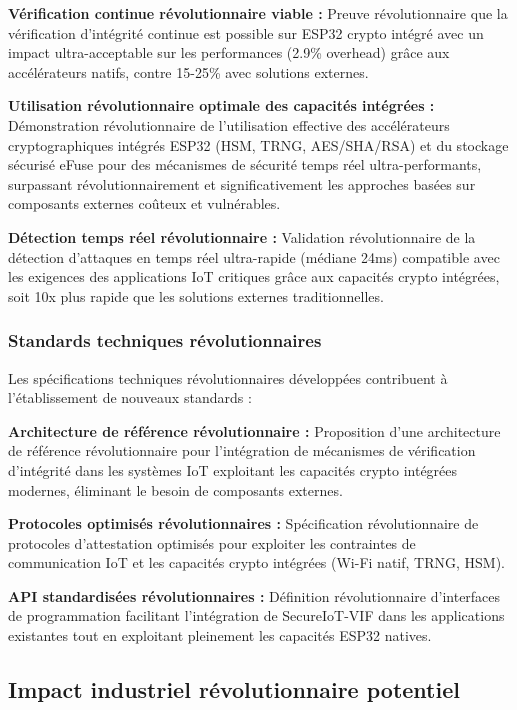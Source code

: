 \textbf{Vérification continue révolutionnaire viable :} Preuve révolutionnaire que la vérification d'intégrité continue est possible sur ESP32 crypto intégré avec un impact ultra-acceptable sur les performances (2.9\% overhead) grâce aux accélérateurs natifs, contre 15-25\% avec solutions externes.

\textbf{Utilisation révolutionnaire optimale des capacités intégrées :} Démonstration révolutionnaire de l'utilisation effective des accélérateurs cryptographiques intégrés ESP32 (HSM, TRNG, AES/SHA/RSA) et du stockage sécurisé eFuse pour des mécanismes de sécurité temps réel ultra-performants, surpassant révolutionnairement et significativement les approches basées sur composants externes coûteux et vulnérables.

\textbf{Détection temps réel révolutionnaire :} Validation révolutionnaire de la détection d'attaques en temps réel ultra-rapide (médiane 24ms) compatible avec les exigences des applications IoT critiques grâce aux capacités crypto intégrées, soit 10x plus rapide que les solutions externes traditionnelles.

\subsubsection{Standards techniques révolutionnaires}

Les spécifications techniques révolutionnaires développées contribuent à l'établissement de nouveaux standards :

\textbf{Architecture de référence révolutionnaire :} Proposition d'une architecture de référence révolutionnaire pour l'intégration de mécanismes de vérification d'intégrité dans les systèmes IoT exploitant les capacités crypto intégrées modernes, éliminant le besoin de composants externes.

\textbf{Protocoles optimisés révolutionnaires :} Spécification révolutionnaire de protocoles d'attestation optimisés pour exploiter les contraintes de communication IoT et les capacités crypto intégrées (Wi-Fi natif, TRNG, HSM).

\textbf{API standardisées révolutionnaires :} Définition révolutionnaire d'interfaces de programmation facilitant l'intégration de SecureIoT-VIF dans les applications existantes tout en exploitant pleinement les capacités ESP32 natives.

\subsection{Impact industriel révolutionnaire potentiel}

